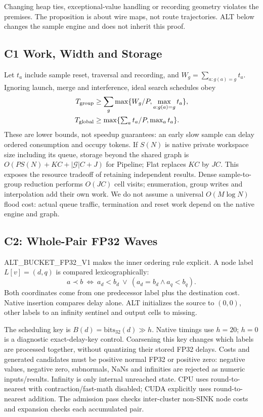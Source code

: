 Changing heap ties, exceptional-value handling or recording geometry violates the premises. The proposition is about wire maps, not route trajectories. ALT below changes the sample engine and does not inherit this proof.

\subsection{C1 Work, Width and Storage}
Let $t_a$ include sample reset, traversal and recording, and $W_g=\sum_{a:g(a)=g}t_a$. Ignoring launch, merge and interference, ideal search schedules obey
\begin{align}
 T_{\rm group}&\geq\sum_g\max\{W_g/P,\max_{a:g(a)=g}t_a\},\\
 T_{\rm global}&\geq\max\{\textstyle\sum_a t_a/P,\max_a t_a\}.
\end{align}
These are lower bounds, not speedup guarantees: an early slow sample can delay ordered consumption and occupy tokens. If $S(N)$ is native private workspace size including its queue, storage beyond the shared graph is $O(P S(N)+KC+|\mathcal G|C+J)$ for Pipeline; Flat replaces $KC$ by $JC$. This exposes the resource tradeoff of retaining independent results. Dense sample-to-group reduction performs $O(JC)$ cell visits; enumeration, group writes and interpolation add their own work. We do not assume a universal $O(M\log N)$ flood cost: actual queue traffic, termination and reset work depend on the native engine and graph.

\subsection{C2: Whole-Pair FP32 Waves}
ALT\_BUCKET\_FP32\_V1 makes the inner ordering rule explicit. A node label $L[v]=(d,q)$ is compared lexicographically:
\begin{equation}
 a\prec b\ \Longleftrightarrow\ a_d<b_d\ \lor\ (a_d=b_d\land a_q<b_q).
\end{equation}
Both coordinates come from one predecessor label plus the destination cost. Native insertion compares delay alone. ALT initializes the source to $(0,0)$, other labels to an infinity sentinel and output cells to missing.

The scheduling key is $B(d)=\mathrm{bits}_{32}(d)\gg h$. Native timings use $h=20$; $h=0$ is a diagnostic exact-delay-key control. Coarsening this key changes which labels are processed together, without quantizing their stored FP32 delays. Costs and generated candidates must be positive normal FP32 or positive zero: negative values, negative zero, subnormals, NaNs and infinities are rejected as numeric inputs/results. Infinity is only internal unreached state. CPU uses round-to-nearest with contraction/fast-math disabled; CUDA explicitly uses round-to-nearest addition. The admission pass checks inter-cluster non-SINK node costs and expansion checks each accumulated pair.

